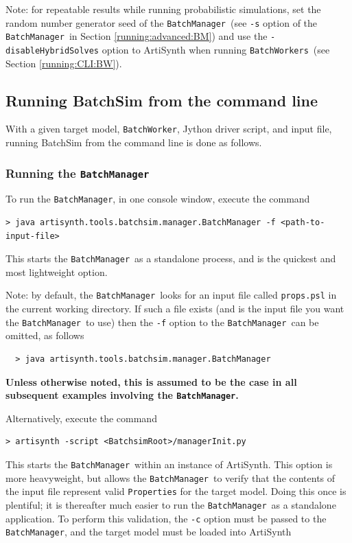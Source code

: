 \documentclass{article}
\newcommand{\BM}{{\tt BatchManager}}
\newcommand{\BW}{{\tt BatchWorker}}
\newcommand{\BWs}{{\tt BatchWorkers}}
\begin{document}
\begin{sideblock}
Note: for repeatable results while running probabilistic simulations, set the random number generator seed of the \BM\ (see {\tt -s} option of the \BM\ in Section \ref{running:advanced:BM}) and use the {\tt -disableHybridSolves} option to ArtiSynth when running \BWs\ (see Section \ref{running:CLI:BW}).
\end{sideblock}

\subsection{Running BatchSim from the command line}
\label{running:CLI}

With a given target model, \BW, Jython driver script, and input file, running BatchSim from the command line is done as follows.

\subsubsection{Running the \BM}
\label{running:CLI:BM}

To run the \BM, in one console window, execute the command

\begin{lstlisting}[]
  > java artisynth.tools.batchsim.manager.BatchManager -f <path-to-input-file>
\end{lstlisting}

This starts the \BM\ as a standalone process, and is the quickest and most lightweight option.

\begin{sideblock}
Note: by default, the \BM\ looks for an input file called {\tt props.psl} in the current working directory. If such a file exists (and is the input file you want the \BM\ to use) then the {\tt -f} option to the \BM\ can be omitted, as follows
\begin{verbatim}
  > java artisynth.tools.batchsim.manager.BatchManager
\end{verbatim}
\textbf{Unless otherwise noted, this is assumed to be the case in all subsequent examples involving the \BM.}
\end{sideblock}

Alternatively, execute the command

\begin{lstlisting}[]
  > artisynth -script <BatchsimRoot>/managerInit.py
\end{lstlisting}

This starts the \BM\ within an instance of ArtiSynth. This option is more heavyweight, but allows the \BM\ to verify that the contents of the input file represent valid {\tt Properties} for the target model. Doing this once is plentiful; it is thereafter much easier to run the \BM\ as a standalone application. To perform this validation, the {\tt -c} option must be passed to the \BM, and the target model must be loaded into ArtiSynth
\end{document}
